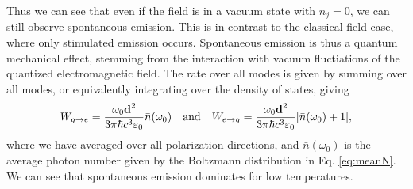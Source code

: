 Thus we can see that even if the field is in a vacuum state with $n_j = 0$, we can still observe spontaneous emission. This is in contrast to the classical field case, where only stimulated emission occurs. Spontaneous emission is thus a quantum mechanical effect, stemming from the interaction with vacuum fluctiations of the quantized electromagnetic field. The rate over all modes is given by summing over all modes, or equivalently integrating over the density of states, giving
\begin{equation}
    W_{g\to e} = \frac{\omega_0 \vec{d}^2}{3\pi \hbar c^3 \varepsilon_0}\bar{n}(\omega_0) \textand W_{e\to g} = \frac{\omega_0 \vec{d}^2}{3\pi \hbar c^3 \varepsilon_0} [\bar{n}(\omega_0) + 1],
\end{equation}
where we have averaged over all polarization directions, and $\bar{n}(\omega_0)$ is the average photon number given by the Boltzmann distribution in Eq. \eqref{eq:meanN}. We can see that spontaneous emission dominates for low temperatures.


